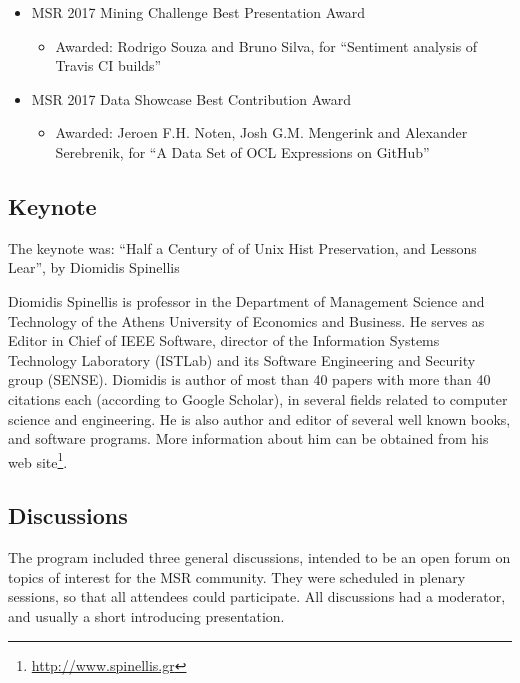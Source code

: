 \documentclass[a4paper]{report}
\begin{document}
\begin{itemize}
\item MSR 2017 Mining Challenge Best Presentation Award
  \begin{itemize}
  \item[] Awarded: Rodrigo Souza and Bruno Silva, for ``Sentiment analysis of Travis CI builds''
  \end{itemize}
  
\item MSR 2017 Data Showcase Best Contribution Award

  \begin{itemize}
  \item[] Awarded: Jeroen F.H. Noten, Josh G.M. Mengerink and Alexander Serebrenik, for  ``A Data Set of OCL Expressions on GitHub''
  \end{itemize}

\end{itemize}


\subsection{Keynote}

The keynote was: ``Half a Century of of Unix Hist Preservation, and Lessons Lear'', by Diomidis Spinellis

Diomidis Spinellis is professor in the Department of Management Science and Technology of the Athens University of Economics and Business. He serves as Editor in Chief of IEEE Software, director of the Information Systems Technology Laboratory (ISTLab) and its Software Engineering and Security group (SENSE). Diomidis is author of most than 40 papers with more than 40 citations each (according to Google Scholar), in several fields related to computer science and engineering. He is also author and editor of several well known books, and software programs. More information about him can be obtained from his web site\footnote{\url{http://www.spinellis.gr}}.


\subsection{Discussions}

The program included three general discussions, intended to be an open forum on topics of interest for the MSR community. They were scheduled in plenary sessions, so that all attendees could participate. All discussions had a moderator, and usually a short introducing presentation.
\end{document}
